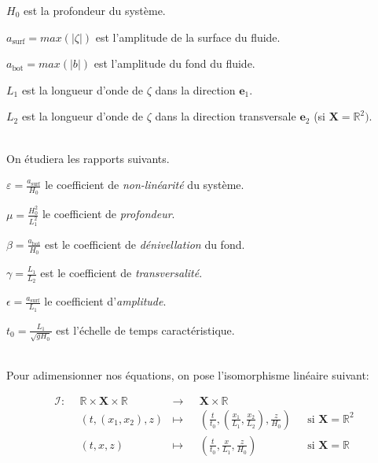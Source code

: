 \documentclass[12pt,a4paper]{article}
\numberwithin{equation}{section}
\begin{document}
\begin{list}{\textbullet}{}
    \item $H_0$ est la profondeur du système.
    \item $a_{\text{surf}} = max(|\zeta|)$ est l'amplitude de la surface du fluide.
    \item $a_{\text{bot}} = max(|b|)$ est l'amplitude du fond du fluide.
    \item $L_1$ est la longueur d'onde de $\zeta$ dans la direction $\textbf{e}_1$.
    \item $L_2$ est la longueur d'onde de $\zeta$ dans la direction transversale $\textbf{e}_2$ (si $\textbf{X} = \mathbb{R}^2)$.
    
 \end{list}
\,
\\

On étudiera les rapports suivants.

\begin{list}{\textbullet}{}
    \item $\varepsilon = \frac{a_{\text{surf}}}{H_0}$ le coefficient de \textit{non-linéarité} du système.
    \item $\mu =\frac{H_0^2}{L_1^2}$ le coefficient de \textit{profondeur}.
    \item $\beta = \frac{a_{\text{bot}}}{H_0}$ est le coefficient de \textit{dénivellation} du fond.
    \item $\gamma = \frac{L_1}{L_2}$ est le coefficient de \textit{transversalité}.
    \item $\epsilon = \frac{ a_{\text{surf}}}{L_1}$ le coefficient d'\textit{amplitude}.
    \item $t_0 = \frac{L_1}{\sqrt{gH_0}}$ est l'échelle de temps caractéristique.
\end{list}

~\\
Pour adimensionner nos équations, on pose l'isomorphisme linéaire suivant:

  
\begin{equation}
\begin{aligned}
      \mathcal{I}:~~&\mathbb{R}\times\textbf{X}\times\mathbb{R} &\longrightarrow ~~~ &\textbf{X}\times \mathbb{R} & \\
      &(t,(x_1,x_2),z) &\longmapsto &\left(\frac{t}{t_0},\left(\frac{x_1}{L_1},\frac{x_2}{L_2} \right),\frac{z}{H_0}\right) ~~~&\text{si }\textbf{X}=\mathbb{R}^2\\
      &(t, x ,z) &\longmapsto &\left(\frac{t}{t_0},\frac{x}{L_1},\frac{z}{H_0}\right) ~~~&\text{si }   \textbf{X}=\mathbb{R}
\end{aligned}
\end{equation}
\end{document}
